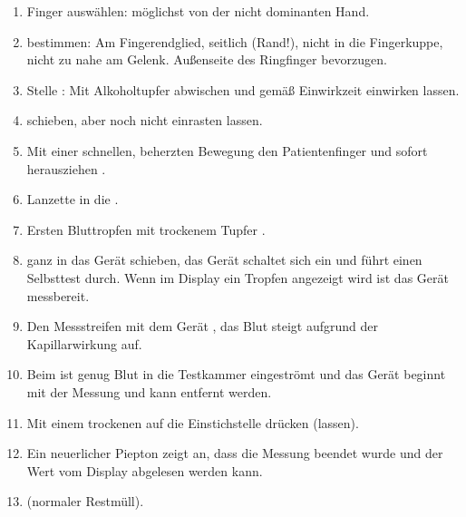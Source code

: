 {
\begin{enumerate}
  \item Finger auswählen: möglichst von der nicht dominanten
  Hand.
  \item {} bestimmen: Am Fingerendglied,
  seitlich (Rand!), nicht in die Fingerkuppe, nicht zu nahe
  am Gelenk. Außenseite des Ringfinger bevorzugen.
  \item Stelle : Mit Alkoholtupfer abwischen
  und gemäß Einwirkzeit einwirken lassen.
  \item {} schieben,
  aber noch nicht einrasten lassen.
  \item Mit einer schnellen, beherzten Bewegung den
  Patientenfinger  und sofort
  herausziehen .
  \item Lanzette in die  .
  \item Ersten Bluttropfen mit trockenem Tupfer .
  \item {} ganz in das Gerät schieben, das Gerät
  schaltet sich ein und führt einen Selbsttest durch. Wenn
  im Display ein Tropfen angezeigt wird ist das Gerät
  messbereit.
  \item Den Messstreifen mit dem Gerät , 
  das Blut steigt aufgrund der Kapillarwirkung auf. 
  \hfill{}
  \item Beim  ist genug Blut in die Testkammer
  eingeströmt und das Gerät beginnt mit der Messung und kann
  entfernt werden. 
  \item Mit einem trockenen  auf die Einstichstelle
  drücken (lassen).
  \item Ein neuerlicher Piepton zeigt an, dass die Messung
  beendet wurde und der Wert vom Display abgelesen
  werden kann. 
  \item {} (normaler Restmüll).
\end{enumerate}
}{

}{}{}{}

